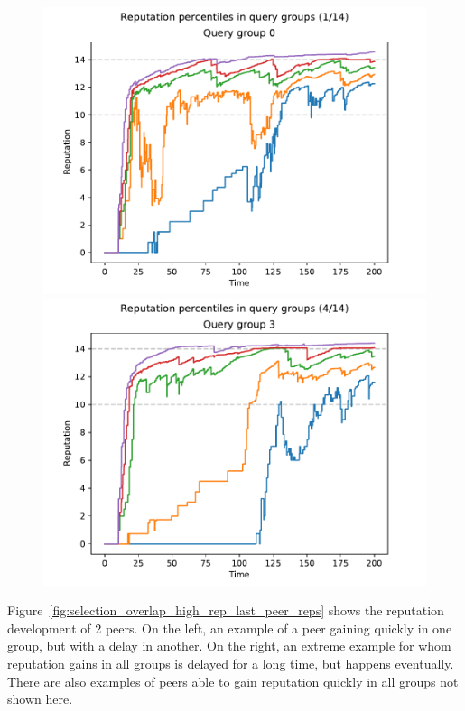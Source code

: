 \begin{figure}[t]
\centering
\includegraphics[width=0.5\columnwidth]{figures/selection_overlap_high_rep_last_rep_percs_1_of_14}%
\includegraphics[width=0.5\columnwidth]{figures/selection_overlap_high_rep_last_rep_percs_4_of_14}
\label{fig:selection_overlap_high_rep_last_rep_percs}
\end{figure}

Figure~\ref{fig:selection_overlap_high_rep_last_peer_reps} shows the reputation
development of 2 peers. On the left, an example of a peer gaining quickly in one
group, but with a delay in another. On the right, an extreme example for whom
reputation gains in all groups is delayed for a long time, but happens
eventually. There are also examples of peers able to gain reputation quickly in
all groups not shown here.

